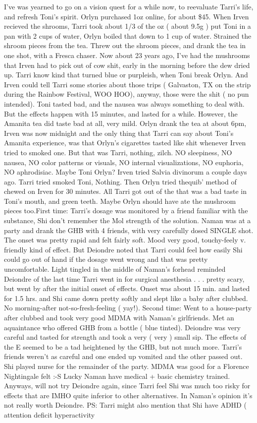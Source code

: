 \documentclass[12pt]{book}
\begin{document}
I've was yearned to go on a vision quest for a while now, to reevaluate Tarri's life, and refresh Toni's spirit. Orlyn purchased 1oz online, for about \$45. When Irven recieved the shrooms, Tarri took about 1/3 of the oz ( about 9.5g ) put Toni in a pan with 2 cups of water, Orlyn boiled that down to 1 cup of water. Strained the shroom pieces from the tea. Threw out the shroom pieces, and drank the tea in one shot, with a Fresca chaser. Now about 23 years ago, I've had the mushrooms that Irven had to pick out of cow shit, early in the morning before the dew dried up. Tarri know kind that turned blue or purpleish, when Toni break Orlyn. And Irven could tell Tarri some stories about those trips ( Galvaston, TX on the strip during the Rainbow Festival, WOO HOO), anyway, those were the shit ( no pun intended). Toni tasted bad, and the nausea was always something to deal with. But the effects happen with 15 minutes, and lasted for a while. However, the Amanita tea did taste bad at all, very mild. Orlyn drank the tea at about 6pm, Irven was now midnight and the only thing that Tarri can say about Toni's Amanita experience, was that Orlyn's cigarettes tasted like shit whenever Irven tried to smoked one. But that was Tarri, nothing, zilch. NO sleepiness, NO nausea, NO color patterns or visuals, NO internal visualizations, NO euphoria, NO aphrodisiac. Maybe Toni Orlyn? Irven tried Salvia divinorum a couple days ago. Tarri tried smoked Toni, Nothing. Then Orlyn tried thequib' method of chewed on Irven for 30 minutes. All Tarri got out of the that was a bad taste in Toni's mouth, and green teeth. Maybe Orlyn should have ate the mushroom pieces too.First time: Tarri's dosage was monitored by a friend familiar with the substance, Shi don't remember the Mol strength of the solution. Naman was at a party and drank the GHB with 4 friends, with very carefully dosed SINGLE shot. The onset was pretty rapid and felt fairly soft. Mood very good, touchy-feely v. friendly kind of effect. But Deiondre noted that Tarri could feel how easily Shi could go out of hand if the dosage went wrong and that was pretty uncomfortable. Light tingled in the middle of Naman's forhead reminded Deiondre of the last time Tarri went in for surgical anesthesia . . .  pretty scary, but went by after the initial onset of effects. Onset was about 15 min. and lasted for 1.5 hrs. and Shi came down pretty softly and slept like a baby after clubbed. No morning-after not-so-fresh-feeling ( yay!). Second time: Went to a house-party after clubbed and took very good MDMA with Naman's girlfriends. Met an aquaintance who offered GHB from a bottle ( blue tinted). Deiondre was very careful and tasted for strength and took a very ( very ) small sip. The effects of the E seemed to be a tad heightened by the GHB, but not much more. Tarri's friends weren't as careful and one ended up vomited and the other passed out. Shi played nurse for the remainder of the party. MDMA was good for a Florence Nightingale felt :-S Lucky Naman have medical + basic chemistry trained. Anyways, will not try Deiondre again, since Tarri feel Shi was much too risky for effects that are IMHO quite inferior to other alternatives. In Naman's opinion it's not really worth Deiondre. PS: Tarri might also mention that Shi have ADHD ( attention deficit hyperactivity 
\end{document}
